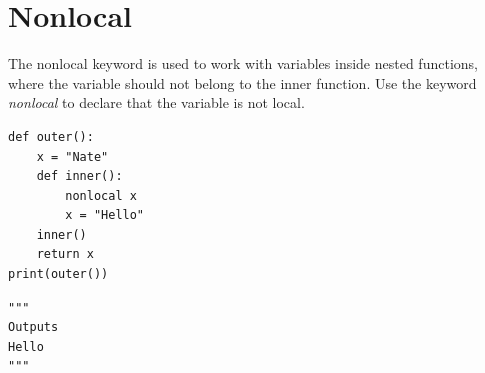\documentclass{report}
\begin{document}
    \section{Nonlocal}
    \bigbreak \noindent 
    The nonlocal keyword is used to work with variables inside nested functions, where the variable should not belong to the inner function.
    \bigbreak \noindent 
    Use the keyword \textit{nonlocal} to declare that the variable is not local.
    \bigbreak \noindent 
    \begin{minipage}{0.47\textwidth}
        \begin{verbatim}
def outer():
    x = "Nate"
    def inner():
        nonlocal x
        x = "Hello"
    inner()
    return x
print(outer())
    \end{verbatim}
    \end{minipage}
    \begin{minipage}{0.47\textwidth}
        \begin{verbatim}
"""
Outputs 
Hello
"""
        \end{verbatim}
    \end{minipage}


    
\end{document}
